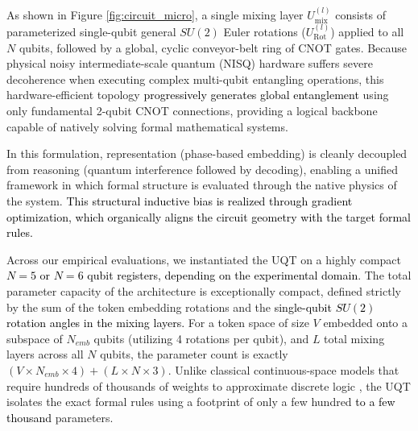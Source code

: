 \documentclass[11pt, a4paper]{article}
\begin{document}
As shown in Figure \ref{fig:circuit_micro}, a single mixing layer $U_{\mathrm{mix}}^{(l)}$ consists of parameterized single-qubit general $SU(2)$ Euler rotations ($U_{\mathrm{Rot}}^{(l)}$) applied to all $N$ qubits, followed by a global, cyclic conveyor-belt ring of CNOT gates. Because physical noisy intermediate-scale quantum (NISQ) hardware suffers severe decoherence when executing complex multi-qubit entangling operations, this hardware-efficient topology \textcolor{black}{progressively generates global entanglement} using only fundamental 2-qubit CNOT connections, providing a logical backbone capable of natively solving formal mathematical systems.

In this formulation, representation (phase-based embedding) is cleanly decoupled from reasoning (quantum interference followed by decoding), enabling a unified framework in which formal structure is evaluated through the native physics of the system. \textcolor{black}{This structural inductive bias is realized through gradient optimization, which organically aligns the circuit geometry with the target formal rules.}

Across our empirical evaluations, we instantiated the UQT on a highly compact \textcolor{black}{$N=5$ or $N=6$ qubit registers, depending on the experimental domain}. The total parameter capacity of the architecture is exceptionally compact, defined strictly by the sum of the token embedding rotations and the \textcolor{black}{single-qubit $SU(2)$ rotation angles in the mixing layers.} For a token space of size $V$ embedded onto a subspace of $N_{emb}$ qubits (utilizing 4 rotations per qubit), and $L$ total mixing layers across all $N$ qubits, the parameter count is exactly $(V \times N_{emb} \times 4) + (L \times N \times 3)$. Unlike classical continuous-space models that require hundreds of thousands of weights to approximate discrete logic \cite{power2022grokking, gromov2023grokking}, the UQT isolates the exact formal rules using a footprint of only a few hundred \textcolor{black}{to a few thousand} parameters.
\end{document}
